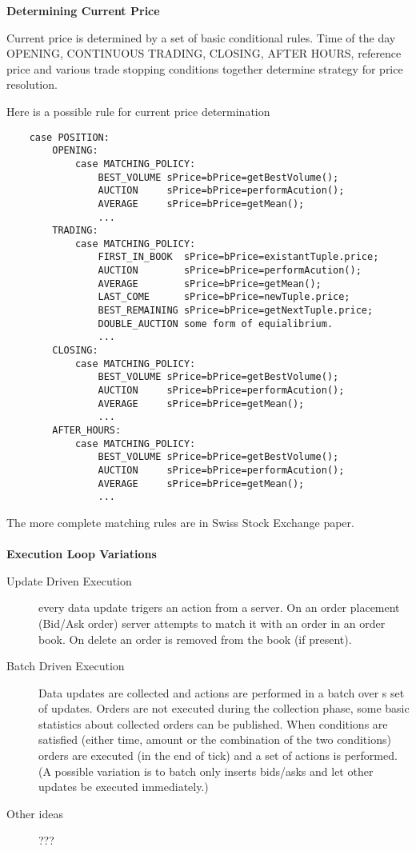\documentclass[11pt]{article}
\begin{document}
{\bf Determining Current Price} 

Current price is determined by a set of basic conditional rules. Time of the day OPENING, CONTINUOUS TRADING, CLOSING, AFTER HOURS, reference price and various trade stopping conditions together determine strategy for price resolution.

Here is a possible rule for current price determination

\begin{program}
    \begin{verbatim}    
    case POSITION:
        OPENING:
            case MATCHING_POLICY:
                BEST_VOLUME sPrice=bPrice=getBestVolume();
                AUCTION     sPrice=bPrice=performAcution();
                AVERAGE     sPrice=bPrice=getMean();
                ...
        TRADING:
            case MATCHING_POLICY:
                FIRST_IN_BOOK  sPrice=bPrice=existantTuple.price;
                AUCTION        sPrice=bPrice=performAcution();
                AVERAGE        sPrice=bPrice=getMean();
                LAST_COME      sPrice=bPrice=newTuple.price;
                BEST_REMAINING sPrice=bPrice=getNextTuple.price;
                DOUBLE_AUCTION some form of equialibrium.
                ...       
        CLOSING:
            case MATCHING_POLICY:
                BEST_VOLUME sPrice=bPrice=getBestVolume();
                AUCTION     sPrice=bPrice=performAcution();
                AVERAGE     sPrice=bPrice=getMean();
                ...
        AFTER_HOURS:
            case MATCHING_POLICY:
                BEST_VOLUME sPrice=bPrice=getBestVolume();
                AUCTION     sPrice=bPrice=performAcution();
                AVERAGE     sPrice=bPrice=getMean();
                ...
    \end{verbatim}
\caption{Price Strategy. }
\end{program}

The more complete matching rules are in Swiss Stock Exchange paper.
\\
\\
{\bf Execution Loop Variations}

\begin{description}
    \item[Update Driven Execution] every data update trigers an action from a server. On an order placement (Bid/Ask order) server attempts to match it with an order in an order book. On delete an order is removed from the book (if present).
    \item[Batch Driven Execution] Data updates are collected and actions are performed in a batch over s set of updates. Orders are not executed during the collection phase, some basic statistics about collected orders can be published. When conditions are satisfied (either time, amount or the combination of the two conditions) orders are executed (in the end of tick) and a set of actions is performed. (A possible variation is to batch only inserts bids/asks and let other updates be executed immediately.)
    \item[Other ideas] ???
\end{description}
\end{document}
